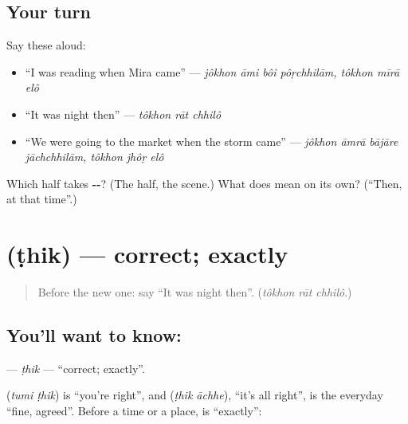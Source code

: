 \subsection*{Your turn}
Say these aloud:

\begin{itemize}
\raggedright
  \item \textquotedblleft{}I was reading when Mira came\textquotedblright{} — \emph{jôkhon āmi bôi pôṛchhilām, tôkhon mīrā elô}
  \item \textquotedblleft{}It was night then\textquotedblright{} — \emph{tôkhon rāt chhilô}
  \item \textquotedblleft{}We were going to the market when the storm came\textquotedblright{} — \emph{jôkhon āmrā bājāre jāchchhilām, tôkhon jhôṛ elô}
\end{itemize}

\begin{tcolorbox}[breakable,colback=teal!4,colframe=teal!35!black,title={Before you move on}]
Which half takes \textbf{--}? (The \textbf{} half, the scene.) What does \textbf{} mean on its own? (\textquotedblleft{}Then, at that time\textquotedblright{}.)
\end{tcolorbox}
\section[\texorpdfstring{\bn{ঠিক} (ṭhik)}{ঠিক (ṭhik)}]{ (ṭhik) — correct; exactly}

\label{lesson:BN-C266-thik}



\begin{quote}
Before the new one: say \textquotedblleft{}It was night then\textquotedblright{}. (\emph{tôkhon rāt chhilô}.)
\end{quote}

\subsection*{You'll want to know: }
\textbf{} — \emph{ṭhik} — \textquotedblleft{}correct; exactly\textquotedblright{}.

\textbf{ } (\emph{tumi ṭhik}) is \textquotedblleft{}you're right\textquotedblright{}, and \textbf{ } (\emph{ṭhik āchhe}), \textquotedblleft{}it's all right\textquotedblright{}, is the everyday \textquotedblleft{}fine, agreed\textquotedblright{}. Before a time or a place, \textbf{} is \textquotedblleft{}exactly\textquotedblright{}:

